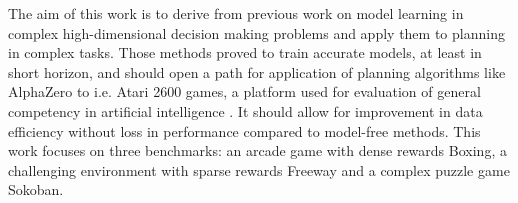 The aim of this work is to derive from previous work on model learning in complex high-dimensional decision making problems \cite{Algo.RecurrentEnvSim}\cite{Algo.JointFrameRewardPrediction}\cite{Algo.FastGenerativeModels}\cite{Algo.PlaNet} and apply them to planning in complex tasks. Those methods proved to train accurate models, at least in short horizon, and should open a path for application of planning algorithms like AlphaZero \cite{Algo.AlphaZero} to i.e. Atari 2600 games, a platform used for evaluation of general competency in artificial intelligence \cite{Benchmark.RevisitingALE}. It should allow for improvement in data efficiency without loss in performance compared to model-free methods. This work focuses on three benchmarks: an arcade game with dense rewards Boxing, a challenging environment with sparse rewards Freeway and a complex puzzle game Sokoban.
